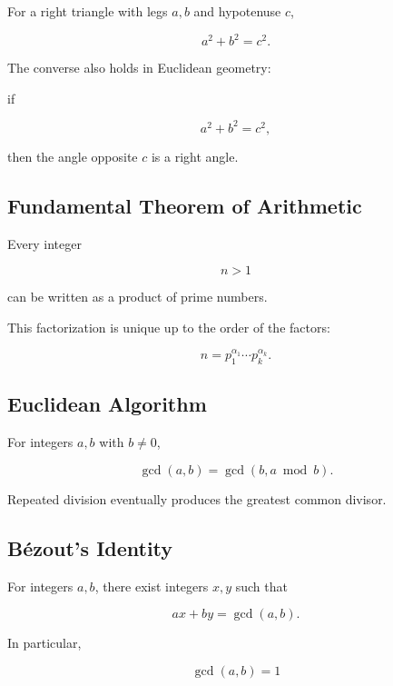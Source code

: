For a right triangle with legs \(a,b\) and hypotenuse \(c\),

\[
\boxed{
a^2+b^2=c^2.
}
\]

The converse also holds in Euclidean geometry:

if

\[
a^2+b^2=c^2,
\]

then the angle opposite \(c\) is a right angle.

\subsection{Fundamental Theorem of Arithmetic}
\label{subsec:fundamental-theorem-arithmetic-summary}

Every integer

\[
n>1
\]

can be written as a product of prime numbers.

This factorization is unique up to the order of the factors:

\[
\boxed{
n
=
p_1^{\alpha_1}
\cdots
p_k^{\alpha_k}.
}
\]

\subsection{Euclidean Algorithm}
\label{subsec:euclidean-algorithm-summary}

For integers \(a,b\) with \(b\neq0\),

\[
\boxed{
\gcd(a,b)
=
\gcd(b,a\bmod b).
}
\]

Repeated division eventually produces the greatest common divisor.

\subsection{Bézout's Identity}
\label{subsec:bezout-identity-summary}

For integers \(a,b\), there exist integers \(x,y\) such that

\[
\boxed{
ax+by
=
\gcd(a,b).
}
\]

In particular,

\[
\gcd(a,b)=1
\]

